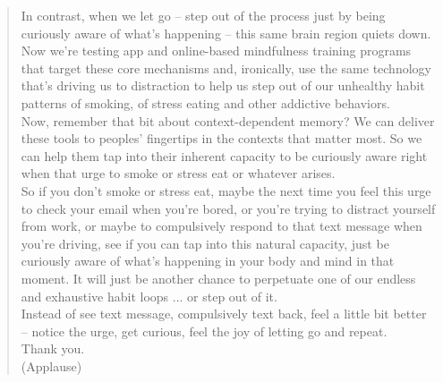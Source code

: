 \documentclass[a4paper,dottedtoc,headinclude,footinclude]{report} %
\theoremstyle{plain}
\begin{document}
\begin{quote}
    In contrast, when we let go -- step out of the process just by being curiously aware of what's happening -- this same brain region quiets down.\\
    Now we're testing app and online-based mindfulness training programs that target these core mechanisms and, ironically, use the same technology that's driving us to distraction to help us step out of our unhealthy habit patterns of smoking, of stress eating and other addictive behaviors.\\
    Now, remember that bit about context-dependent memory? We can deliver these tools to peoples' fingertips in the contexts that matter most. So we can help them tap into their inherent capacity to be curiously aware right when that urge to smoke or stress eat or whatever arises.\\
    So if you don't smoke or stress eat, maybe the next time you feel this urge to check your email when you're bored, or you're trying to distract yourself from work, or maybe to compulsively respond to that text message when you're driving, see if you can tap into this natural capacity, just be curiously aware of what's happening in your body and mind in that moment. It will just be another chance to perpetuate one of our endless and exhaustive habit loops ... or step out of it.\\
    Instead of see text message, compulsively text back, feel a little bit better -- notice the urge, get curious, feel the joy of letting go and repeat.\\
    Thank you.\\
    (Applause)\\
    \end{quote}
    

    \iffalse
    \nocite{*}
    \addtocontents{toc}{\protect\vspace{\beforebibskip}}
    \addcontentsline{toc}{section}{\refname}    
    
    
    \fi
\end{document}
